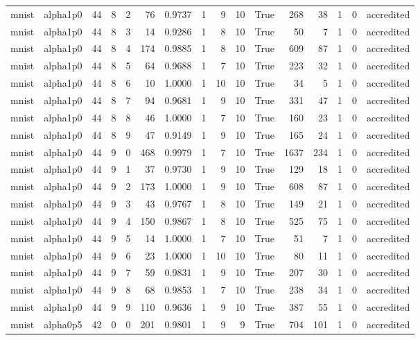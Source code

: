 \begin{tabular}{llrrrrrrrrrrrrrl}
mnist & alpha1p0 & 44 & 8 & 2 & 76 & 0.9737 & 1 & 9 & 10 & True & 268 & 38 & 1 & 0 & accredited \\
mnist & alpha1p0 & 44 & 8 & 3 & 14 & 0.9286 & 1 & 8 & 10 & True & 50 & 7 & 1 & 0 & accredited \\
mnist & alpha1p0 & 44 & 8 & 4 & 174 & 0.9885 & 1 & 8 & 10 & True & 609 & 87 & 1 & 0 & accredited \\
mnist & alpha1p0 & 44 & 8 & 5 & 64 & 0.9688 & 1 & 7 & 10 & True & 223 & 32 & 1 & 0 & accredited \\
mnist & alpha1p0 & 44 & 8 & 6 & 10 & 1.0000 & 1 & 10 & 10 & True & 34 & 5 & 1 & 0 & accredited \\
mnist & alpha1p0 & 44 & 8 & 7 & 94 & 0.9681 & 1 & 9 & 10 & True & 331 & 47 & 1 & 0 & accredited \\
mnist & alpha1p0 & 44 & 8 & 8 & 46 & 1.0000 & 1 & 7 & 10 & True & 160 & 23 & 1 & 0 & accredited \\
mnist & alpha1p0 & 44 & 8 & 9 & 47 & 0.9149 & 1 & 9 & 10 & True & 165 & 24 & 1 & 0 & accredited \\
mnist & alpha1p0 & 44 & 9 & 0 & 468 & 0.9979 & 1 & 7 & 10 & True & 1637 & 234 & 1 & 0 & accredited \\
mnist & alpha1p0 & 44 & 9 & 1 & 37 & 0.9730 & 1 & 9 & 10 & True & 129 & 18 & 1 & 0 & accredited \\
mnist & alpha1p0 & 44 & 9 & 2 & 173 & 1.0000 & 1 & 9 & 10 & True & 608 & 87 & 1 & 0 & accredited \\
mnist & alpha1p0 & 44 & 9 & 3 & 43 & 0.9767 & 1 & 8 & 10 & True & 149 & 21 & 1 & 0 & accredited \\
mnist & alpha1p0 & 44 & 9 & 4 & 150 & 0.9867 & 1 & 8 & 10 & True & 525 & 75 & 1 & 0 & accredited \\
mnist & alpha1p0 & 44 & 9 & 5 & 14 & 1.0000 & 1 & 7 & 10 & True & 51 & 7 & 1 & 0 & accredited \\
mnist & alpha1p0 & 44 & 9 & 6 & 23 & 1.0000 & 1 & 10 & 10 & True & 80 & 11 & 1 & 0 & accredited \\
mnist & alpha1p0 & 44 & 9 & 7 & 59 & 0.9831 & 1 & 9 & 10 & True & 207 & 30 & 1 & 0 & accredited \\
mnist & alpha1p0 & 44 & 9 & 8 & 68 & 0.9853 & 1 & 7 & 10 & True & 238 & 34 & 1 & 0 & accredited \\
mnist & alpha1p0 & 44 & 9 & 9 & 110 & 0.9636 & 1 & 9 & 10 & True & 387 & 55 & 1 & 0 & accredited \\
mnist & alpha0p5 & 42 & 0 & 0 & 201 & 0.9801 & 1 & 9 & 9 & True & 704 & 101 & 1 & 0 & accredited \\

\end{tabular}
